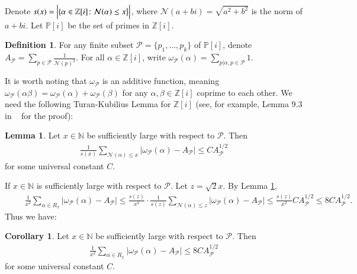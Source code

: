 \documentclass[12pt,amstex]{amsart}
\theoremstyle{definition}
\newtheorem{lem}[thm]{Lemma}
\newtheorem{defn}[thm]{Definition}
\newtheorem{cor}[thm]{Corollary}
\def \Z {\mathbb{Z}[i]}
\def \P {\mathbb{P}[i]}
\def \A {\alpha}
\def \B {\beta}
\begin{document}
Denote $s(x)=\Bigl\vert \{\A\in\Z\colon \mathcal{N}(\A)\leq x\bigr\}\Bigr\vert$, where $\mathcal{N}(a+bi)=\sqrt{a^{2}+b^{2}}$ is the norm of $a+bi$. Let $\P$ be the set of primes in $\Z$.


\begin{defn}
For any finite subset $\mathcal{P}=\{p_{1},\dots,p_{k}\}$ of $\P$, denote $A_{\mathcal{P}}=\sum_{p\in \mathcal{P}}\frac{1}{\mathcal{N}(p)^{2}}$. For all $\A\in\Z$, write $\omega_{\mathcal{P}}(\A)=\sum_{p|\A,p\in\mathcal{P}}1$.
\end{defn}

It is worth noting that $\omega_{\mathcal{P}}$ is an additive function, meaning $\omega_{\mathcal{P}}(\A\B)=\omega_{\mathcal{P}}(\A)+\omega_{\mathcal{P}}(\B)$ for any $\A,\B\in\Z$ coprime to each other.
We need the following Turan-Kubilius Lemma for $\Z$ (see, for example, Lemma 9.3 in ~\cite{FH} for the proof):

\begin{lem}\label{TK} Let $x\in\mathbb{N}$ be sufficiently large with respect to $\mathcal{P}$. Then
\begin{equation}\label{TK2}
  \begin{split}
    \frac{1}{s(x)}\sum_{\mathcal{N}(\A)\leq x}\vert\omega_{\mathcal{P}}(\A)-A_{\mathcal{P}}\vert\leq C A_{\mathcal{P}}^{1/2}
  \end{split}
\end{equation}
for some universal constant $C$.
\end{lem}

If $x\in\mathbb{N}$ is sufficiently large with respect to $\mathcal{P}$. Let $z=\sqrt{2}x$. By Lemma \ref{TK},
  \begin{equation}\nonumber
  \begin{split}
    \qquad\frac{1}{x^{2}}\sum_{\A\in R_{x}}\vert\omega_{\mathcal{P}}(\A)-A_{\mathcal{P}}\vert
    \leq \frac{s(z)}{x^{2}}\cdot\frac{1}{s(z)}\sum_{\mathcal{N}(\A)\leq z}\vert\omega_{\mathcal{P}}(\A)-A_{\mathcal{P}}\vert
    \leq \frac{s(z)}{x^{2}}C A_{\mathcal{P}}^{1/2}\leq 8C A_{\mathcal{P}}^{1/2}.
  \end{split}
\end{equation}
Thus we have:

\begin{cor}\label{TK3} Let $x\in\mathbb{N}$ be sufficiently large with respect to $\mathcal{P}$. Then
\begin{equation}\nonumber
  \begin{split}
    \frac{1}{x^{2}}\sum_{\A\in R_{x}}\vert\omega_{\mathcal{P}}(\A)-A_{\mathcal{P}}\vert\leq 8 C A_{\mathcal{P}}^{1/2}
  \end{split}
\end{equation}
for some universal constant $C$.
\end{cor}
\end{document}
